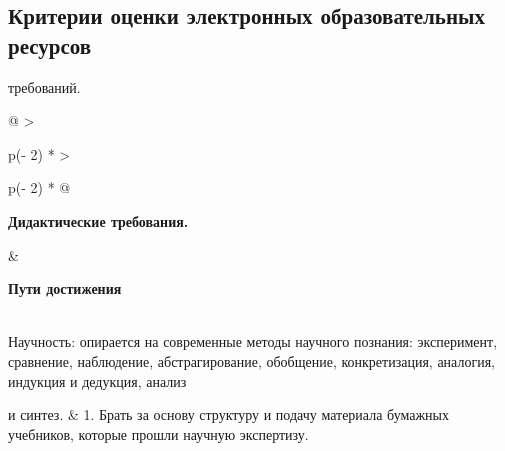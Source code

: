 \subsection{Критерии оценки электронных образовательных ресурсов}
требований.

\begin{longtable}[]{@{}
  >{\raggedright\arraybackslash}p{(\columnwidth - 2\tabcolsep) * }
  >{\raggedright\arraybackslash}p{(\columnwidth - 2\tabcolsep) * }@{}}
\toprule
\begin{minipage}[b]{\linewidth}\raggedright
\textbf{Дидактические требования.}
\end{minipage} & \begin{minipage}[b]{\linewidth}\raggedright
\textbf{Пути достижения}
\end{minipage} \\
\midrule
\endhead
Научность: опирается на современные методы научного познания:
эксперимент, сравнение, наблюдение, абстрагирование, обобщение,
конкретизация, аналогия, индукция и дедукция, анализ

и синтез. & 1. Брать за основу структуру и подачу материала бумажных
учебников, которые прошли научную экспертизу.


\end{longtable}
